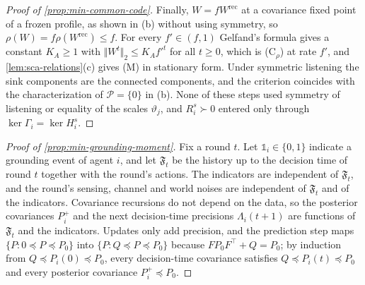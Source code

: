 \begin{proof}[Proof of \cref{prop:min-common-code}]
Finally, $W=fW^{\mathrm{rec}}$ at a covariance fixed point of a frozen profile, as shown in (b) without using symmetry, so $\rho(W)=f\rho(W^{\mathrm{rec}})\le f$. For every $f'\in(f,1)$ Gelfand's formula gives a constant $K_A\ge1$ with $\Vert W^t\Vert_2\le K_Af'^t$ for all $t\ge0$, which is \textup{(C$_\rho$)} at rate $f'$, and \cref{lem:sca-relations}(c) gives \textup{(M)} in stationary form. Under symmetric listening the sink components are the connected components, and the criterion coincides with the characterization of $\mathcal P=\{0\}$ in (b). None of these steps used symmetry of listening or equality of the scales $\vartheta_j$, and $R^s_i\succ0$ entered only through $\ker\Gamma_i=\ker H^s_i$.
\end{proof}

\begin{proof}[Proof of \cref{prop:min-grounding-moment}]
Fix a round $t$. Let $\mathbb 1_i\in\{0,1\}$ indicate a grounding event of agent $i$, and let $\mathfrak F_t$ be the history up to the decision time of round $t$ together with the round's actions. The indicators are independent of $\mathfrak F_t$, and the round's sensing, channel and world noises are independent of $\mathfrak F_t$ and of the indicators. Covariance recursions do not depend on the data, so the posterior covariances $P^+_i$ and the next decision-time precisions $\Lambda_i(t+1)$ are functions of $\mathfrak F_t$ and the indicators. Updates only add precision, and the prediction step maps $\{P:0\preceq P\preceq P_0\}$ into $\{P:Q\preceq P\preceq P_0\}$ because $FP_0F^\top+Q=P_0$; by induction from $Q\preceq P_i(0)\preceq P_0$, every decision-time covariance satisfies $Q\preceq P_i(t)\preceq P_0$ and every posterior covariance $P^+_i\preceq P_0$.


\end{proof}
